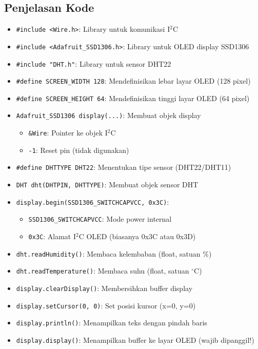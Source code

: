 \documentclass[12pt,a4paper]{article}
\begin{document}
\subsection{Penjelasan Kode}
\begin{itemize}
    \item \texttt{\#include <Wire.h>}: Library untuk komunikasi I$^2$C
    \item \texttt{\#include <Adafruit\_SSD1306.h>}: Library untuk OLED display SSD1306
    \item \texttt{\#include "DHT.h"}: Library untuk sensor DHT22
    \item \texttt{\#define SCREEN\_WIDTH 128}: Mendefinisikan lebar layar OLED (128 pixel)
    \item \texttt{\#define SCREEN\_HEIGHT 64}: Mendefinisikan tinggi layar OLED (64 pixel)
    \item \texttt{Adafruit\_SSD1306 display(...)}: Membuat objek display
    \begin{itemize}
        \item \texttt{\&Wire}: Pointer ke objek I$^2$C
        \item \texttt{-1}: Reset pin (tidak digunakan)
    \end{itemize}
    \item \texttt{\#define DHTTYPE DHT22}: Menentukan tipe sensor (DHT22/DHT11)
    \item \texttt{DHT dht(DHTPIN, DHTTYPE)}: Membuat objek sensor DHT
    \item \texttt{display.begin(SSD1306\_SWITCHCAPVCC, 0x3C)}: 
    \begin{itemize}
        \item \texttt{SSD1306\_SWITCHCAPVCC}: Mode power internal
        \item \texttt{0x3C}: Alamat I$^2$C OLED (biasanya 0x3C atau 0x3D)
    \end{itemize}
    \item \texttt{dht.readHumidity()}: Membaca kelembaban (float, satuan \%)
    \item \texttt{dht.readTemperature()}: Membaca suhu (float, satuan $^\circ$C)
    \item \texttt{display.clearDisplay()}: Membersihkan buffer display
    \item \texttt{display.setCursor(0, 0)}: Set posisi kursor (x=0, y=0)
    \item \texttt{display.println()}: Menampilkan teks dengan pindah baris
    \item \texttt{display.display()}: Menampilkan buffer ke layar OLED (wajib dipanggil!)
\end{itemize}
\end{document}
